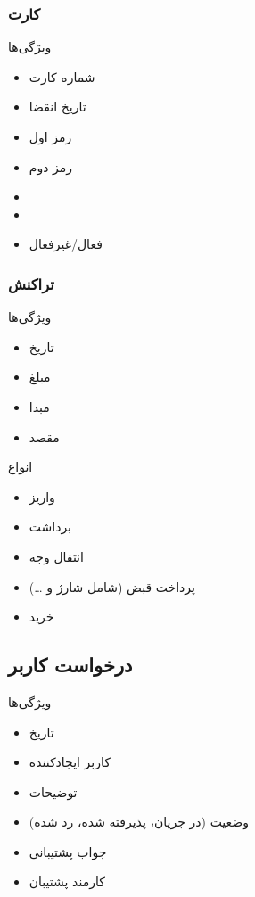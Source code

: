 \documentclass{article}
\begin{document}
        \subsubsection{کارت}
            ویژگی‌ها
            \begin{itemize}
                \item شماره کارت
                \item تاریخ انقضا
                \item رمز اول
                \item رمز دوم
                \item {}
                \item {}
                \item فعال/غیرفعال
            \end{itemize}

        \subsubsection{تراکنش}
            ویژگی‌ها
            \begin{itemize}
                \item تاریخ
                \item مبلغ
                \item مبدا
                \item مقصد
            \end{itemize}
            انواع
            \begin{itemize}
                \item واریز
                \item برداشت
                \item انتقال وجه
                \item پرداخت قبض (شامل شارژ و \dots)
                \item خرید
            \end{itemize}
            
        \subsection{درخواست کاربر}
            ویژگی‌ها
            \begin{itemize}
                \item تاریخ
                \item کاربر ایجادکننده
                \item توضیحات
                \item وضعیت (در جریان، پذیرفته شده، رد شده)
                \item جواب پشتیبانی
                \item کارمند پشتیبان
            \end{itemize}
\end{document}
